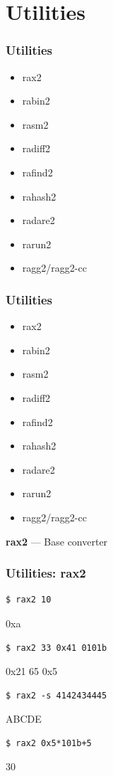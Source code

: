 \documentclass[10pt, compress]{beamer}
\begin{document}
\section{Utilities}

\begin{frame}[fragile]
  \frametitle{Utilities}
     \begin{itemize}
        \item rax2
        \item rabin2
        \item rasm2
        \item radiff2
        \item rafind2
        \item rahash2
        \item radare2
        \item rarun2
        \item ragg2/ragg2-cc
      \end{itemize}
\end{frame}

\begin{frame}[fragile]
  \frametitle{Utilities}
     \begin{itemize}
        \item \alert{rax2}
        \item rabin2
        \item rasm2
        \item radiff2
        \item rafind2
        \item rahash2
        \item radare2
        \item rarun2
        \item ragg2/ragg2-cc
      \end{itemize}
\end{frame}

\begin{frame}[fragile]
  \center\textbf{rax2} — Base converter
  \noindent\makebox[\linewidth]{\rule{\paperwidth}{0.4pt}}
  \frametitle{Utilities: rax2}
  \begin{verbatim}$ rax2 10\end{verbatim}
  \alert{0xa}
  \begin{verbatim}$ rax2 33 0x41 0101b\end{verbatim}
  \alert{0x21 65 0x5}
  \begin{verbatim}$ rax2 -s 4142434445\end{verbatim}
  \alert{ABCDE}
  \begin{verbatim}$ rax2 0x5*101b+5\end{verbatim}
  \alert{30}

\end{frame}
\end{document}
